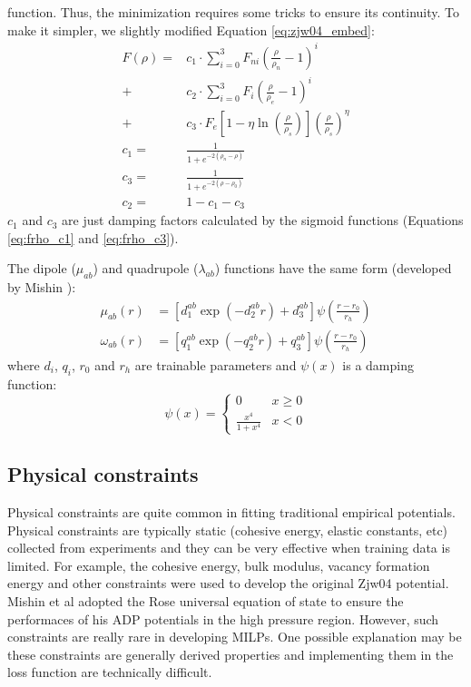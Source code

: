\documentclass[final,3p,times]{elsarticle}
\begin{document}
function. Thus, the minimization requires some tricks to ensure its continuity.
To make it simpler, we slightly modified Equation \ref{eq:zjw04_embed}:
\begin{align}
\label{eq:zjw04xc_embed}
F(\rho) 
= & c_1 \cdot
\sum_{i=0}^{3}{F_{ni}\left( \frac{\rho}{\rho_n} - 1 \right)^{i}} \nonumber \\
+ & c_2 \cdot 
\sum_{i=0}^{3}{F_{i}\left( \frac{\rho}{\rho_e} - 1 \right)^{i}} \nonumber \\
+ & c_3 \cdot
F_{e}\left[1 - \eta\ln\left( \frac{\rho}{\rho_s}\right)\right]
(\frac{\rho}{\rho_s})^{\eta} \\
\label{eq:frho_c1}
c_{1} = & \frac{1}{1 + e^{-2\left(\rho_{n} - \rho\right)}} \\
\label{eq:frho_c3}
c_{3} = & \frac{1}{1 + e^{-2\left(\rho - \rho_{0}\right)}} \\
c_{2} = & 1 - c_1 - c_3
\end{align}
$c_1$ and $c_3$ are just damping factors calculated by the sigmoid 
functions (Equations \ref{eq:frho_c1} and \ref{eq:frho_c3}).

The dipole ($\mu_{ab}$) and quadrupole ($\lambda_{ab}$) functions have the same 
form (developed by Mishin \cite{ADP0}):
\begin{align}
\label{eq:adp_dipole}
\mu_{ab}(r) & = \left[
    d_{1}^{ab} \exp\left( -d_{2}^{ab}r \right) + d_{3}^{ab}
\right] \psi\left( \frac{r - r_{0}}{r_{h}} \right) \\
\omega_{ab}(r) & = \left[
    q_{1}^{ab} \exp\left( -q_{2}^{ab}r \right) + q_{3}^{ab}
\right] \psi\left( \frac{r - r_{0}}{r_{h}} \right)
\end{align}
where $d_{i}$, $q_{i}$, $r_0$ and $r_{h}$ are trainable parameters and $\psi(x)$
is a damping function:
\begin{equation}
\label{eq:mishin_cutoff}
\psi(x) = \begin{cases}
    0 & x \ge 0 \\
    \frac{x^4}{1 + x^4} & x < 0 
\end{cases}
\end{equation}

\subsection{Physical constraints}
\label{sec:constraints}

Physical constraints are quite common in fitting traditional empirical 
potentials. Physical constraints are typically static (cohesive energy, elastic 
constants, etc) collected from experiments and they can be very effective when 
training data is limited. For example, the cohesive energy, bulk modulus, 
vacancy formation energy and other constraints were used to develop the original 
Zjw04 potential. Mishin et al adopted the Rose universal equation of state to 
ensure the performaces of his ADP potentials in the high pressure region. 
However, such constraints are really rare in developing MILPs. One possible 
explanation may be these constraints are generally derived properties and 
implementing them in the loss function are technically difficult.
\end{document}
